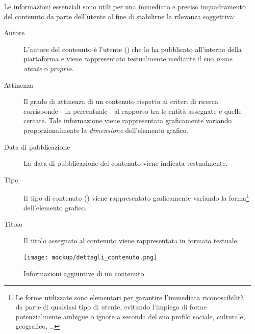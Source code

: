 \documentclass[10pt,a4paper,headinclude,footinclude,hidelinks]{scrreprt} %
\begin{document}
	Le informazioni essenziali sono utili per una immediato e preciso inquadramento del contenuto da parte dell'utente al fine di stabilirne la rilevanza soggettiva:
	\begin{description}
	\item[Autore] L'autore del contenuto è l'utente (\textit{}) che lo ha pubblicato all'interno della piattaforma e viene rappresentato testualmente mediante il suo \textit{nome utente} o \textit{proprio}.
	\item[Attinenza] Il grado di attinenza di un contenuto rispetto ai criteri di ricerca corrisponde - in percentuale - al rapporto tra le entità assegnate e quelle cercate. Tale informazione viene rappresentata graficamente variando proporzionalmente la \textit{dimensione} dell'elemento grafico.
	\item[Data di pubblicazione] La data di pubblicazione del contenuto viene indicata testualmente.
	\item[Tipo] Il tipo di contenuto (\textit{}) viene rappresentato graficamente variando la forma\footnote{Le forme utilizzate sono elementari per garantire l'immediata riconoscibilità da parte di qualsiasi tipo di utente, evitando l'impiego di forme potenzialmente ambigue o ignote a seconda del suo profilo sociale, culturale, geografico, \ldots} dell'elemento grafico.
	\item[Titolo] Il titolo assegnato al contenuto viene rappresentata in formato testuale.
	\end{description}

	\begin{figure}[ht]
		\begin{center}
	    	\texttt{[image: mockup/dettagli\_contenuto.png]}
			\label{gfx:mockup:content-details}
			\caption{Informazioni aggiuntive di un contenuto}
		\end{center}
	\end{figure}
\end{document}

